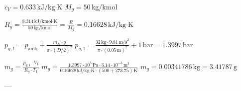 \( c_V = 0.633 \, \text{kJ/kg·K} \)  
\( M_g = 50 \, \text{kg/kmol} \)  

\( R_g = \frac{8.314 \, \text{kJ/kmol·K}}{50 \, \text{kg/kmol}} = \frac{R}{M_g} = 0.16628 \, \text{kJ/kg·K} \)  

\( p_{g,1} = p_{\text{amb}} + \frac{m_K \cdot g}{\pi \cdot (D/2)^2} \)  
\( p_{g,1} = \frac{32 \, \text{kg} \cdot 9.81 \, \text{m/s}^2}{\pi \cdot (0.05 \, \text{m})^2} + 1 \, \text{bar} = 1.3997 \, \text{bar} \)  

\( m_g = \frac{p_{g,1} \cdot V_1}{R_g \cdot T_1} \)  
\( m_g = \frac{1.3997 \cdot 10^5 \, \text{Pa} \cdot 3.14 \cdot 10^{-3} \, \text{m}^3}{0.16628 \, \text{kJ/kg·K} \cdot (500 + 273.75) \, \text{K}} \)  
\( m_g = 0.00341786 \, \text{kg} = 3.41787 \, \text{g} \)  

---